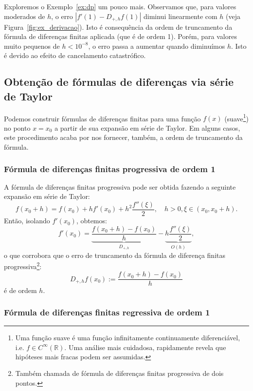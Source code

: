 Exploremos o Exemplo~\ref{ex:dp} um pouco mais. Observamos que, para valores moderados de $h$, o erro $|f'(1)-D_{+,h}f(1)|$ diminui linearmente com $h$ (veja Figura~\ref{fig:ex_derivacao}). Isto é consequência da ordem de truncamento da fórmula de diferenças finitas aplicada (que é de ordem 1). Porém, para valores muito pequenos de $h < 10^{-8}$, o erro passa a aumentar quando diminuímos $h$. Isto é devido ao efeito de cancelamento catastrófico.

\subsection{Obtenção de fórmulas de diferenças via série de Taylor}

Podemos construir fórmulas de diferenças finitas para uma função $f(x)$ (suave\footnote{Uma função suave é uma função infinitamente continuamente diferenciável, i.e. $f\in C^\infty(\mathbb{R})$. Uma análise mais cuidadosa, rapidamente revela que hipóteses mais fracas podem ser assumidas.}) no ponto $x = x_0$ a partir de sua expansão em série de Taylor. Em alguns casos, este procedimento acaba por nos fornecer, também, a ordem de truncamento da fórmula.

\subsubsection{Fórmula de diferenças finitas progressiva de ordem 1}

A fórmula de diferenças finitas progressiva pode ser obtida fazendo a seguinte expansão em série de Taylor:
\begin{equation*}
  f(x_0+h) = f(x_0) + hf'(x_0) + h^2\frac{f''(\xi)}{2},\quad h>0, \xi\in(x_0,x_0+h).
\end{equation*}
Então, isolando $f'(x_0)$, obtemos:
\begin{equation}\label{eq:dp_trunc}
  f'(x_0) = \underbrace{\frac{f(x_0+h) - f(x_0)}{h}}_{D_{+,h}} - \underbrace{h\frac{f''(\xi)}{2}}_{O(h)},
\end{equation}
o que corrobora que o erro de truncamento da fórmula de diferença finitas progressiva\footnote{Também chamada de fórmula de diferenças finitas progressiva de dois pontos.}:
\begin{equation*}
  D_{+,h}f(x_0) := \frac{f(x_0+h)-f(x_0)}{h}
\end{equation*}
é de ordem $h$.

\subsubsection{Fórmula de diferenças finitas regressiva de ordem 1}

